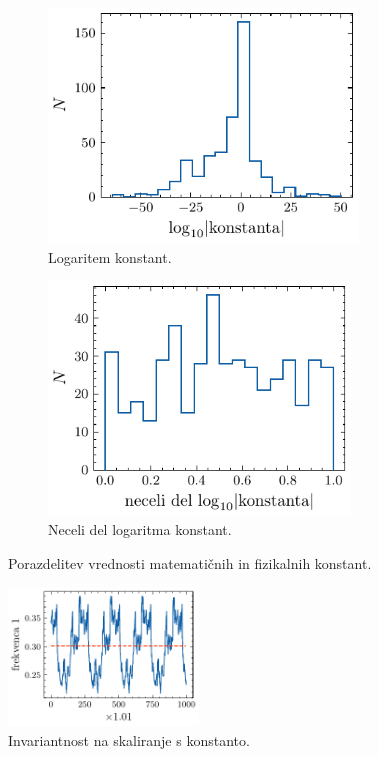\documentclass[11pt, oneside]{article}
\theoremstyle{definition}
\begin{document}
\begin{figure}[h!]
    \centering
    \begin{subfigure}[b]{0.49\textwidth}
        \centering
        \includegraphics[width=0.9\textwidth]{benford_konstante_log.pdf}
        \caption{Logaritem konstant.}
        \label{fig: ben_konst1}
    \end{subfigure}
    \hfill
    \begin{subfigure}[b]{0.49\textwidth}
        \centering
        \includegraphics[width=0.88\textwidth]{benford_konstante_neceli.pdf}
        \caption{Neceli del logaritma konstant.}
        \label{fig: ben_konst2}
    \end{subfigure}
    \caption{Porazdelitev vrednosti matematičnih in fizikalnih konstant.}
\end{figure}

\begin{figure}[h!]
    \centering
    \includegraphics[width=0.45\textwidth]{benford_konstante_freq_1.pdf}
    \caption{Invariantnost na skaliranje s konstanto.}
    \label{fig: ben_konst3}
\end{figure}
\end{document}
